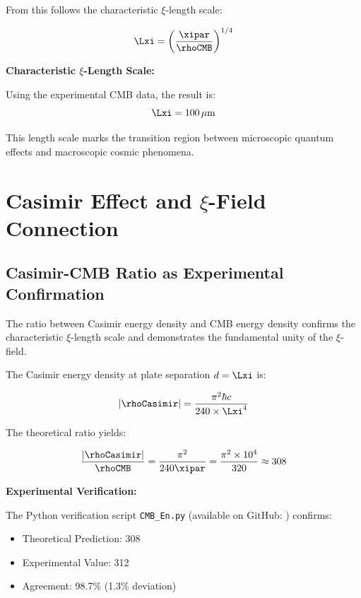 	From this follows the characteristic $\xi$-length scale:
	
	\begin{equation}
		\Lxi = \left(\frac{\xipar}{\rhoCMB}\right)^{1/4}
	\end{equation}
	
	\begin{keyresult}
		\textbf{Characteristic $\xi$-Length Scale:}
		
		Using the experimental CMB data, the result is:
		\begin{equation}
			\Lxi = 100 \, \mu\text{m}
		\end{equation}
		
		This length scale marks the transition region between microscopic quantum effects and macroscopic cosmic phenomena.
	\end{keyresult}
	
	\section{Casimir Effect and $\xi$-Field Connection}
	
	\subsection{Casimir-CMB Ratio as Experimental Confirmation}
	
	The ratio between Casimir energy density and CMB energy density confirms the characteristic $\xi$-length scale and demonstrates the fundamental unity of the $\xi$-field.
	
	The Casimir energy density at plate separation $d = \Lxi$ is:
	
	\begin{equation}
		|\rhoCasimir| = \frac{\pi^2 \hbar c}{240 \times \Lxi^4}
	\end{equation}
	
	The theoretical ratio yields:
	
	\begin{equation}
		\frac{|\rhoCasimir|}{\rhoCMB} = \frac{\pi^2}{240 \xipar} = \frac{\pi^2 \times 10^4}{320} \approx 308
	\end{equation}
	
	\begin{experiment}
		\textbf{Experimental Verification:}
		
		The Python verification script \texttt{CMB\_En.py} (available on GitHub: ) confirms:
		
		\begin{itemize}
			\item Theoretical Prediction: 308
			\item Experimental Value: 312
			\item Agreement: 98.7\% (1.3\% deviation)
		\end{itemize}
	\end{experiment}
	
